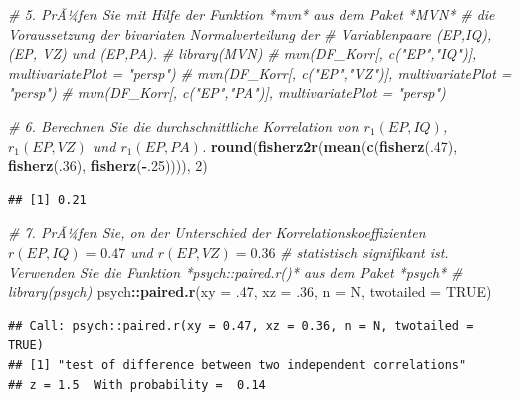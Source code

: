 \documentclass[]{article}
\newenvironment{Shaded}{\begin{snugshade}}{\end{snugshade}}
\newcommand{\CommentTok}[1]{\textcolor[rgb]{0.56,0.35,0.01}{\textit{#1}}}
\newcommand{\DataTypeTok}[1]{\textcolor[rgb]{0.13,0.29,0.53}{#1}}
\newcommand{\DecValTok}[1]{\textcolor[rgb]{0.00,0.00,0.81}{#1}}
\newcommand{\FloatTok}[1]{\textcolor[rgb]{0.00,0.00,0.81}{#1}}
\newcommand{\KeywordTok}[1]{\textcolor[rgb]{0.13,0.29,0.53}{\textbf{#1}}}
\newcommand{\NormalTok}[1]{#1}
\newcommand{\OperatorTok}[1]{\textcolor[rgb]{0.81,0.36,0.00}{\textbf{#1}}}
\newcommand{\OtherTok}[1]{\textcolor[rgb]{0.56,0.35,0.01}{#1}}
\begin{document}
\begin{Shaded}
\begin{Highlighting}[]
  \CommentTok{# 5. PrÃ¼fen Sie mit Hilfe der Funktion *mvn* aus dem Paket *MVN* }
  \CommentTok{#    die Voraussetzung der bivariaten Normalverteilung der }
  \CommentTok{#    Variablenpaare (EP,IQ), (EP, VZ) und (EP,PA).}
    \CommentTok{# library(MVN)}
    \CommentTok{# mvn(DF_Korr[, c("EP","IQ")], multivariatePlot = "persp")}
    \CommentTok{# mvn(DF_Korr[, c("EP","VZ")], multivariatePlot = "persp")}
    \CommentTok{# mvn(DF_Korr[, c("EP","PA")], multivariatePlot = "persp")}

  \CommentTok{# 6. Berechnen Sie die durchschnittliche Korrelation von $r_1(EP,IQ)$, $r_1(EP,VZ)$ und $r_1(EP,PA)$.}
      \KeywordTok{round}\NormalTok{(}\KeywordTok{fisherz2r}\NormalTok{(}\KeywordTok{mean}\NormalTok{(}\KeywordTok{c}\NormalTok{(}\KeywordTok{fisherz}\NormalTok{(.}\DecValTok{47}\NormalTok{), }\KeywordTok{fisherz}\NormalTok{(.}\DecValTok{36}\NormalTok{), }\KeywordTok{fisherz}\NormalTok{(}\OperatorTok{-}\NormalTok{.}\DecValTok{25}\NormalTok{)))), }\DecValTok{2}\NormalTok{)}
\end{Highlighting}
\end{Shaded}

\begin{verbatim}
## [1] 0.21
\end{verbatim}

\begin{Shaded}
\begin{Highlighting}[]
  \CommentTok{# 7. PrÃ¼fen Sie, on der Unterschied der Korrelationskoeffizienten $r(EP,IQ) = 0.47$ und $r(EP,VZ) = 0.36$}
  \CommentTok{#    statistisch signifikant ist. Verwenden Sie die Funktion *psych::paired.r()* aus dem Paket *psych*}
    \CommentTok{# library(psych)}
\NormalTok{    psych}\OperatorTok{::}\KeywordTok{paired.r}\NormalTok{(}\DataTypeTok{xy        =} \FloatTok{.47}\NormalTok{, }
             \DataTypeTok{xz        =} \FloatTok{.36}\NormalTok{, }
             \DataTypeTok{n         =}\NormalTok{ N,}
             \DataTypeTok{twotailed =} \OtherTok{TRUE}\NormalTok{) }
\end{Highlighting}
\end{Shaded}

\begin{verbatim}
## Call: psych::paired.r(xy = 0.47, xz = 0.36, n = N, twotailed = TRUE)
## [1] "test of difference between two independent correlations"
## z = 1.5  With probability =  0.14
\end{verbatim}
\end{document}
